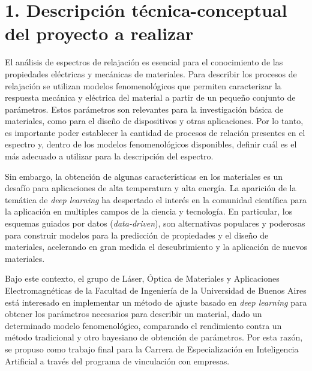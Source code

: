 \documentclass[
11pt, %
codirector, %
]{charter}
\begin{document}
\section{1. Descripción técnica-conceptual del proyecto a realizar}
\label{sec:descripcion}


El análisis de espectros de relajación es esencial para el conocimiento de las propiedades
eléctricas y mecánicas de materiales. Para describir los procesos de relajación 
se utilizan modelos fenomenológicos que permiten caracterizar la respuesta mecánica 
y eléctrica del material a partir de un pequeño conjunto de parámetros.
Estos parámetros son relevantes para la investigación básica de materiales, como para el
diseño de dispositivos y otras aplicaciones. Por lo tanto, es importante poder establecer la cantidad 
de procesos de relación presentes en el espectro y, dentro de los modelos fenomenológicos disponibles,
definir cuál es el más adecuado a utilizar para la descripción del espectro.

Sin embargo, la obtención de algunas características en los materiales es un desafío para 
aplicaciones de alta temperatura y alta energía. La aparición de la temática de \textit{deep learning}
ha despertado el interés en la comunidad científica para la aplicación en multiples campos de la ciencia y tecnología. 
En particular, los esquemas guiados por datos (\textit{data-driven}), son alternativas populares y
poderosas para construir modelos para la predicción de propiedades y el diseño de
materiales, acelerando en gran medida el descubrimiento y la aplicación de nuevos materiales.


Bajo este contexto, el grupo de Láser, Óptica de Materiales y Aplicaciones 
Electromagnéticas de la Facultad de Ingeniería de la Universidad de Buenos Aires 
está interesado en implementar un método de ajuste basado en \textit{deep learning} para 
obtener los parámetros necesarios para describir un material, dado un determinado 
modelo fenomenológico, comparando el rendimiento contra un método tradicional y 
otro bayesiano de obtención de parámetros. Por esta razón, se propuso como trabajo 
final para la Carrera de Especialización en Inteligencia Artificial a través del 
programa de vinculación con empresas.
\end{document}
